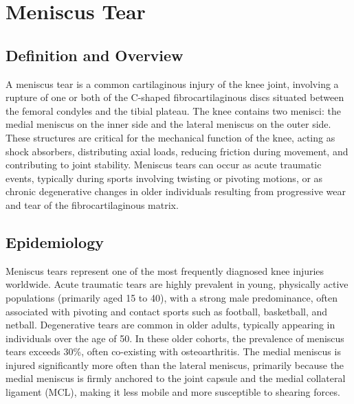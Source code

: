 \chapter{Meniscus Tear}

\section*{Definition and Overview}
A meniscus tear is a common cartilaginous injury of the knee joint, involving a rupture of one or both of the C-shaped fibrocartilaginous discs situated between the femoral condyles and the tibial plateau. The knee contains two menisci: the medial meniscus on the inner side and the lateral meniscus on the outer side. These structures are critical for the mechanical function of the knee, acting as shock absorbers, distributing axial loads, reducing friction during movement, and contributing to joint stability. Meniscus tears can occur as acute traumatic events, typically during sports involving twisting or pivoting motions, or as chronic degenerative changes in older individuals resulting from progressive wear and tear of the fibrocartilaginous matrix.

\section*{Epidemiology}
Meniscus tears represent one of the most frequently diagnosed knee injuries worldwide. Acute traumatic tears are highly prevalent in young, physically active populations (primarily aged 15 to 40), with a strong male predominance, often associated with pivoting and contact sports such as football, basketball, and netball. Degenerative tears are common in older adults, typically appearing in individuals over the age of 50. In these older cohorts, the prevalence of meniscus tears exceeds 30\%, often co-existing with osteoarthritis. The medial meniscus is injured significantly more often than the lateral meniscus, primarily because the medial meniscus is firmly anchored to the joint capsule and the medial collateral ligament (MCL), making it less mobile and more susceptible to shearing forces.

